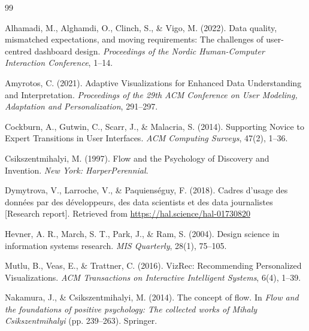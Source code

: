\documentclass[Afour,times,sageh]{sagej}
\begin{document}

\begin{thebibliography}{99}

Alhamadi, M., Alghamdi, O., Clinch, S., \& Vigo, M. (2022).
\newblock Data quality, mismatched expectations, and moving requirements: The challenges of user-centred dashboard design.
\newblock \textit{Proceedings of the Nordic Human-Computer Interaction Conference}, 1--14.
\newblock {}


 Amyrotos, C. (2021).
 \newblock Adaptive Visualizations for Enhanced Data Understanding and Interpretation.
 \newblock \textit{Proceedings of the 29th ACM Conference on User Modeling, Adaptation and Personalization}, 291--297.
 \newblock {}

 Cockburn, A., Gutwin, C., Scarr, J., \& Malacria, S. (2014).
 \newblock Supporting Novice to Expert Transitions in User Interfaces.
 \newblock \textit{ACM Computing Surveys}, 47(2), 1--36.
 \newblock {}

Csikszentmihalyi, M. (1997). Flow and the Psychology of Discovery and Invention. \textit{New York: HarperPerennial}.

Dymytrova, V., Larroche, V., \& Paquienséguy, F. (2018).
\newblock Cadres d'usage des données par des développeurs, des data scientists et des data journalistes [Research report].
\newblock Retrieved from \url{https://hal.science/hal-01730820}

Hevner, A. R., March, S. T., Park, J., \& Ram, S. (2004).
\newblock Design science in information systems research.
\newblock \textit{MIS Quarterly}, 28(1), 75--105.

 Mutlu, B., Veas, E., \& Trattner, C. (2016).
 \newblock VizRec: Recommending Personalized Visualizations.
 \newblock \textit{ACM Transactions on Interactive Intelligent Systems}, 6(4), 1--39.
 \newblock {}

Nakamura, J., \& Csikszentmihalyi, M. (2014).
\newblock The concept of flow.
\newblock In \textit{Flow and the foundations of positive psychology: The collected works of Mihaly Csikszentmihalyi} (pp. 239--263).
\newblock Springer.


\end{thebibliography}
\end{document}
